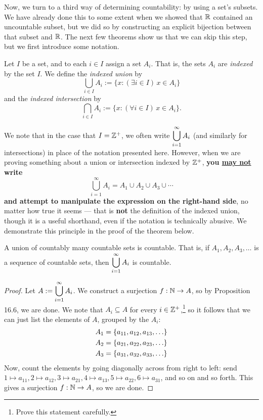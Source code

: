 \documentclass{article}
\begin{document}
Now, we turn to a third way of determining countability: by using a set's subsets. We have already done this to some extent when we showed that $\mathbb R$ contained an uncountable subset, but we did so by constructing an explicit bijection between that subset and $\mathbb R$. The next few theorems show us that we can skip this step, but we first introduce some notation.
\begin{definition}
Let $I$ be a set, and to each $i\in I$ assign a set $A_i$. That is, the sets $A_i$ are \textit{indexed} by the set $I$. We define the \textit{indexed union} by
$$\bigcup_{i\in I} A_i := \Big\{x: (\exists i\in I)\, x\in A_i\Big\}$$
and the \textit{indexed intersection} by
$$\bigcap_{i\in I} A_i := \Big\{x: (\forall i\in I)\, x\in A_i\Big\}.$$
\end{definition}
We note that in the case that $I = \mathbb Z^+$, we often write $\displaystyle\bigcup_{i=1}^\infty A_i$ (and similarly for intersections) in place of the notation presented here. However, when we are proving something about a union or intersection indexed by $\mathbb Z^+$, \textbf{you \underline{may not} write}
$$\bigcup_{i=1}^\infty A_i = A_1 \cup A_2 \cup A_3 \cup \cdots$$
\textbf{and attempt to manipulate the expression on the right-hand side}, no matter how true it seems --- that is \textbf{not} the definition of the indexed union, though it is a useful shorthand, even if the notation is technically abusive. We demonstrate this principle in the proof of the theorem below.

\begin{theorem}
A union of countably many countable sets is countable. That is, if $A_1, A_2, A_3,\ldots$ is a sequence of countable sets, then $\displaystyle\bigcup_{i=1}^\infty A_i$ is countable.
\end{theorem}
\begin{proof}
Let $A := \displaystyle\bigcup_{i=1}^\infty A_i$. We construct a surjection $f: \mathbb N\to A$, so by Proposition 16.6, we are done. We note that $A_i\subseteq A$ for every $i\in\mathbb Z^+$,\footnote{Prove this statement carefully.} so it follows that we can just list the elements of $A$, grouped by the $A_i$:
\begin{align*}
 A_1 &= \left\{a_{11}, a_{12}, a_{13}, \ldots\right\} \\
 A_2 &= \left\{a_{21}, a_{22}, a_{23}, \ldots\right\} \\
 A_3 &= \left\{a_{31}, a_{32}, a_{33}, \ldots\right\}
\end{align*}
Now, count the elements by going diagonally across from right to left: send $1\mapsto a_{11}, 2\mapsto a_{12}, 3\mapsto a_{21}, 4\mapsto a_{13}, 5\mapsto a_{22}, 6\mapsto a_{31}$, and so on and so forth. This gives a surjection $f: \mathbb N\to A$, so we are done.
\end{proof}
\end{document}
